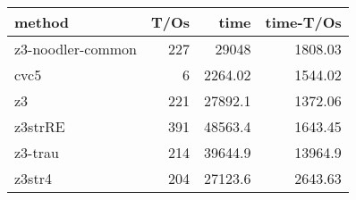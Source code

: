 \begin{tabular}{lrrr}
\hline
 method            &   T/Os &     time &   time-T/Os \\
\hline
 z3-noodler-common &    227 & 29048    &     1808.03 \\
 cvc5              &      6 &  2264.02 &     1544.02 \\
 z3                &    221 & 27892.1  &     1372.06 \\
 z3strRE           &    391 & 48563.4  &     1643.45 \\
 z3-trau           &    214 & 39644.9  &    13964.9  \\
 z3str4            &    204 & 27123.6  &     2643.63 \\
\hline
\end{tabular}
